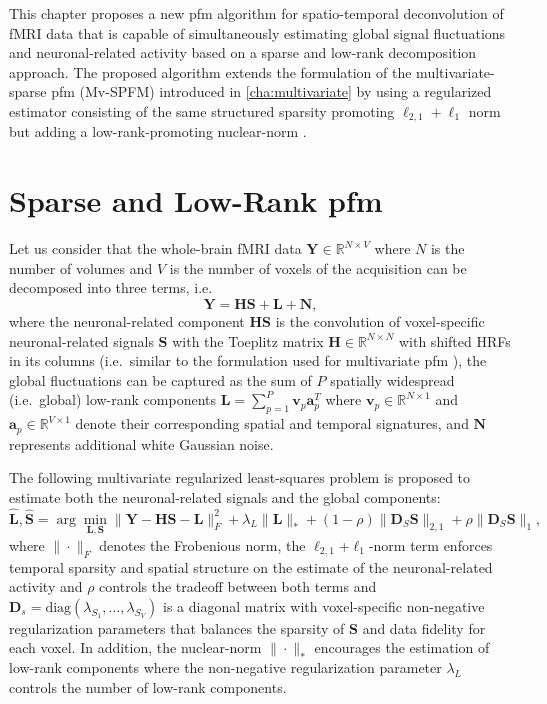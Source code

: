 This chapter proposes a new \acrlong*{pfm} algorithm for spatio-temporal
deconvolution of fMRI data that is capable of simultaneously estimating global
signal fluctuations and neuronal-related activity based on a sparse and low-rank
decomposition approach. The proposed algorithm extends the formulation of the
multivariate-sparse \acrlong*{pfm} (Mv-SPFM)
introduced in \cref{cha:multivariate} by using a regularized estimator
consisting of the same structured sparsity promoting $\ell_{2,1}+\ell_1$ norm
but adding a low-rank-promoting nuclear-norm \citep{Otazo2015Lowrankplus}.

\section{Sparse and Low-Rank \acrlong*{pfm}}
\label{sec:low_rank_lrs_pfm}
Let us consider that the whole-brain fMRI data $\mathbf{Y} \in
\mathbb{R}^{N \times V}$ where $N$ is the number of volumes and $V$ is the
number of voxels of the acquisition can be decomposed into three terms, i.e.\ 
\begin{equation} \label{eq:2}
    \mathbf{Y} = \mathbf{HS} + \mathbf{L} + \mathbf{N},
\end{equation}
where the neuronal-related component $\mathbf{H}\mathbf{S}$ is the convolution
of voxel-specific neuronal-related signals $\mathbf{S}$ with the Toeplitz matrix
$\mathbf{H} \in \mathbb{R}^{N \times N}$ with shifted HRFs in its columns (i.e.\
similar to the formulation used for multivariate \acrlong*{pfm}
\cite{Urunuela2022Wholebrainmultivariate}), the global fluctuations can be
captured as the sum of $P$ spatially widespread (i.e.\ global) low-rank
components $\mathbf{L}=\sum_{p=1}^{P}\mathbf{v}_p\mathbf{a}_p^T$ where
$\mathbf{v}_p \in \mathbb{R}^{N \times 1}$ and $\mathbf{a}_p \in
\mathbb{R}^{V \times 1}$ denote their corresponding spatial and temporal
signatures, and $\mathbf{N}$ represents additional white Gaussian noise.

The following multivariate regularized least-squares problem is proposed to
estimate both the neuronal-related signals and the global components:
\begin{equation} \label{eq:low_rank_inverse_problem}
    \mathbf{\hat{L}}, \mathbf{\hat{S}} = \arg \min_{\mathbf{L}, \mathbf{S}} \| \mathbf{Y} - \mathbf{HS} - \mathbf{L} \|_F^2 + \lambda_L \| \mathbf{L} \|_* 
    + (1 - \rho) \| \mathbf{D}_S \mathbf{S}  \|_{2,1} + \rho \| \mathbf{D}_S \mathbf{S}  \|_1,
\end{equation}
where $\|\cdot\|_F$ denotes the Frobenious norm, the
$\ell_{2,1}$+$\ell_{1}$-norm term enforces temporal sparsity and spatial
structure on the estimate of the neuronal-related activity and $\rho$ controls
the tradeoff between both terms
\citep{Gramfort2011FunctionalBrainImaging,Urunuela2022Wholebrainmultivariate}
and $\mathbf{D}_s=\text{diag}\left(\lambda_{S_1},\ldots,\lambda_{S_V} \right)$
is a diagonal matrix with voxel-specific non-negative regularization parameters
that balances the sparsity of $\mathbf{S}$ and data fidelity for each voxel. In
addition, the nuclear-norm $\|\cdot\|_*$ encourages the estimation of low-rank
components where the non-negative regularization parameter $\lambda_L$ controls
the number of low-rank components.

